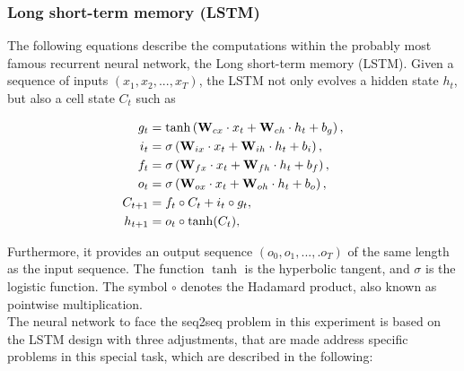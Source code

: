 
\subsubsection{Long short-term memory (LSTM)}

The following equations describe the computations within the probably most famous recurrent neural network, the Long short-term memory (LSTM). Given a sequence of inputs $(x_1,x_2,...,x_T)$, the LSTM not only evolves a hidden state $h_t$, but also a cell state $C_t$ such as 

\begin{align}
    g_t&=\tanh\left(\textbf{W}_{cx}\cdot x_t + \textbf{W}_{ch}\cdot h_{t} + b_g\right), \notag\\
    i_t&=\sigma\left(\textbf{W}_{ix}\cdot x_t + \textbf{W}_{ih}\cdot h_{t} + b_i\right), \notag\\
    f_t&=\sigma\left(\textbf{W}_{fx}\cdot x_t + \textbf{W}_{fh}\cdot h_{t} + b_f\right), \notag\\
    o_t&=\sigma\left(\textbf{W}_{ox}\cdot x_t + \textbf{W}_{oh}\cdot h_{t} + b_o\right), \notag\\
    C_{t+1}&=f_t\circ C_{t}+i_t\circ g_t, \notag\\
    h_{t+1}&=o_t\circ\tanh(C_t),\notag\\
    \label{eq:lstm}
\end{align}

Furthermore, it provides an output sequence $(o_0,o_1,...,.o_T)$ of the same length as the input sequence. The function $\tanh$ is the hyperbolic tangent, and $\sigma$ is the logistic function. The symbol $\circ$ denotes the Hadamard product, also known as pointwise multiplication.\\%

The neural network to face the seq2seq problem in this experiment is based on the LSTM design with three adjustments, that are made address specific problems in this special task, which are described in the following:

